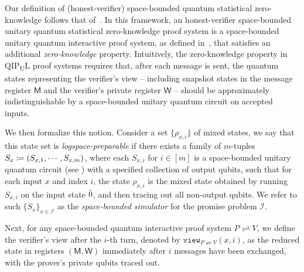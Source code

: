 \documentclass[11pt, a4paper]{article}
\numberwithin{equation}{section}
\numberwithin{figure}{section}
\newcommand{\QIPUL}{\texorpdfstring{\textnormal{\textsf{QIP}\textsubscript{\textnormal{U}}\textsf{L}}}\xspace}
\newcommand{\view}[2]{\mathtt{view}_{{#1}\rightleftharpoons{#2}}}
\newcommand{\protocol}[2]{{#1}\!\rightleftharpoons\!{#2}}
\DeclarePairedDelimiter\rbra{\lparen}{\rparen}
\let\ket\relax\DeclarePairedDelimiter\ket{\lvert}{\rangle}
\newcommand{\calI}{\mathcal{I}}
\newcommand{\sfM}{\mathsf{M}}
\newcommand{\sfW}{\mathsf{W}}
\begin{document}
Our definition of (honest-verifier) space-bounded quantum statistical zero-knowledge follows that of~\cite[Section 3.1]{Wat02QSZK}. In this framework, an honest-verifier space-bounded unitary quantum statistical zero-knowledge proof system is a space-bounded unitary quantum interactive proof system, as defined in~, that satisfies an additional \textit{zero-knowledge} property. Intuitively, the zero-knowledge property in \QIPUL{} proof systems requires that, after each message is sent, the quantum states representing the verifier's view -- including snapshot states in the message register $\sfM$ and the verifier's private register $\sfW$ -- should be approximately indistinguishable by a space-bounded unitary quantum circuit on accepted inputs. 

We then formalize this notion. Consider a set $\{\rho_{x,i}\}$ of mixed states, we say that this state set is \textit{logspace-preparable} if there exists a family of $m$-tuples $S_x \coloneqq \rbra*{S_{x,1},\cdots,S_{x,m}}$, where each $S_{x,i}$ for $i \in [m]$ is a space-bounded unitary quantum circuit (see ) with a specified collection of output qubits, such that for each input $x$ and index $i$, the state $\rho_{x,i}$ is the mixed state obtained by running $S_{x,i}$ on the input state $\ket{\bar{0}}$, and then tracing out all non-output qubits. We refer to such $\{S_x\}_{x\in\calI}$ as the \textit{space-bounded simulator} for the promise problem $\calI$. 

Next, for any space-bounded quantum interactive proof system $\protocol{P}{V}$, we define the verifier's view after the $i$-th turn, denoted by $\view{P}{V}(x,i)$, as the reduced state in registers $(\sfM,\sfW)$ immediately after $i$ messages have been exchanged, with the prover's private qubits traced out. 
\end{document}

